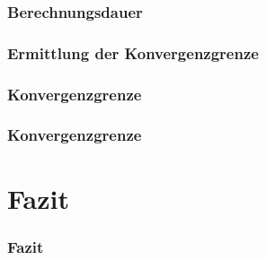 \documentclass[hyperref={pdfpagelabels=false},compress]{beamer}
\begin{document}
\begin{frame}
	\frametitle{Berechnungsdauer}
\end{frame}

\begin{frame}
	\frametitle{Ermittlung der Konvergenzgrenze}
\end{frame}

\begin{frame}
	\frametitle{Konvergenzgrenze}
\end{frame}

\begin{frame}
	\frametitle{Konvergenzgrenze}
\end{frame}

\section{Fazit}

\begin{frame}
	\frametitle{Fazit}
\end{frame}
\end{document}

